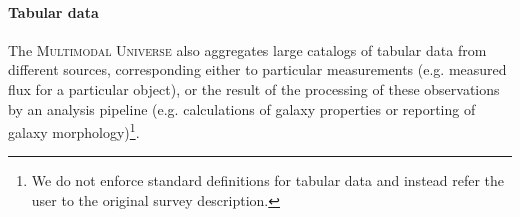 \documentclass[dvipsnames,table]{article}
\newcommand\pile{\textsc{Multimodal Universe}\xspace}
\newcommand{\FL}[1]{{\color{magenta}FL: #1}}
\begin{document}
\paragraph{Tabular data} The \pile also aggregates large catalogs of tabular data from different sources, corresponding either to particular measurements (e.g. measured flux for a particular object), or the result of the processing of these observations by an analysis pipeline (e.g. calculations of galaxy properties or reporting of galaxy morphology)\footnote{We do not enforce standard definitions for tabular data
and instead refer the user to the original survey description.}. 
\end{document}
